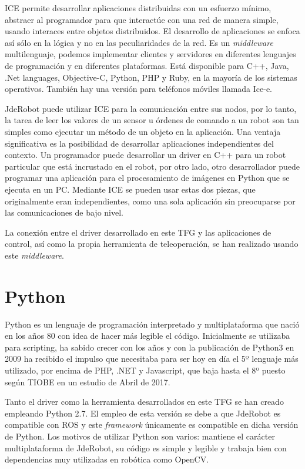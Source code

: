 ICE permite desarrollar aplicaciones distribuidas con un esfuerzo mínimo, abstraer al programador para que interactúe con una red de manera simple, usando interaces entre objetos distribuidos. El desarrollo de aplicaciones se enfoca así sólo en la lógica y no en las peculiaridades de la red. Es un \textit{middleware} multilenguaje, podemos implementar clientes y servidores en diferentes lenguajes de programación y en diferentes plataformas. Está disponible para C++, Java, .Net languages, Objective-C, Python, PHP y Ruby, en la mayoría de los sistemas operativos. También hay una versión para teléfonos móviles llamada Ice-e. 

JdeRobot puede utilizar ICE para la comunicación entre sus nodos, por lo tanto, la tarea de leer
los valores de un sensor u órdenes de comando a un robot son tan simples como ejecutar un método de un objeto en la aplicación. Una ventaja significativa es la posibilidad de desarrollar aplicaciones independientes del contexto. Un programador puede desarrollar un driver en C++ para un robot particular que está incrustado en el robot, por otro lado, otro desarrollador puede programar una aplicación para el procesamiento de imágenes en Python que se ejecuta en un PC. Mediante ICE se pueden usar estas dos piezas, que originalmente eran independientes, como una sola aplicación sin preocuparse por las comunicaciones de bajo nivel.

La conexión entre el driver desarrollado en este TFG y las aplicaciones de control, así como la propia herramienta de teleoperación, se han realizado usando este \textit{middleware}.

\section{Python}
\label{sec:python}

Python\cite{python} es un lenguaje de programaci\'on interpretado y multiplataforma que naci\'o en los años 80 con idea de hacer más legible el c\'odigo.
Inicialmente se utilizaba para scripting, ha sabido crecer con los años y con la publicaci\'on de Python3 en 2009 ha recibido el impulso que necesitaba para ser hoy en día el 5º lenguaje más utilizado, por encima de PHP, .NET y Javascript, que baja hasta el 8º puesto según TIOBE en un estudio de Abril de 2017.

Tanto el driver como la herramienta desarrollados en este TFG se han creado empleando Python 2.7. El empleo de esta versión se debe a que JdeRobot es compatible con ROS y este \textit{framework} únicamente es compatible en dicha versión de Python. Los motivos de utilizar Python son varios: mantiene el carácter multiplataforma de JdeRobot, su c\'odigo es simple y legible y trabaja bien con dependencias muy utilizadas en rob\'otica como OpenCV.


\cleardoublepage